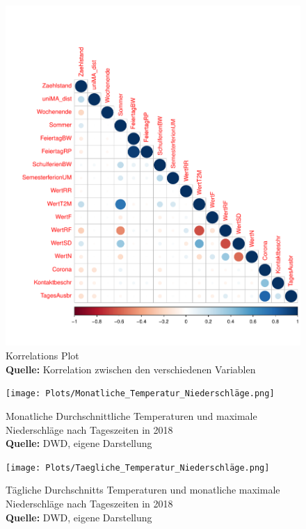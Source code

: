 \documentclass[a4paper,12pt]{thesis}
\newcommand*{\captionsource}[2]{%
	\caption[{#1}]{%
		#1%
		\\\hspace{\linewidth}%
		\textbf{Quelle:} #2%
	}%
}
\begin{document}
\begin{figure}[!ht]
	\centering
	\includegraphics[width=\textwidth]{Plots/Corr_Plot.pdf}
	\captionsource{Korrelations Plot}{
		Korrelation zwischen den verschiedenen Variablen
	}
	\label{fig:meine-grafik5}
\end{figure}

\begin{figure}[!ht]
	\centering
	\texttt{[image: Plots/Monatliche\_Temperatur\_Niederschläge.png]}
	\captionsource{Monatliche Durchschnittliche Temperaturen und maximale Niederschläge nach Tageszeiten in 2018}{
		DWD, eigene Darstellung
	}
	\label{fig:meine-grafik5}
\end{figure}

\begin{figure}[!ht]
	\centering
	\texttt{[image: Plots/Taegliche\_Temperatur\_Niederschläge.png]}
	\captionsource{Tägliche Durchschnitts Temperaturen und monatliche maximale Niederschläge nach Tageszeiten in 2018}{
		DWD, eigene Darstellung
	}
	\label{fig:meine-grafik5}
\end{figure}

\newpage
{}

\end{document}
